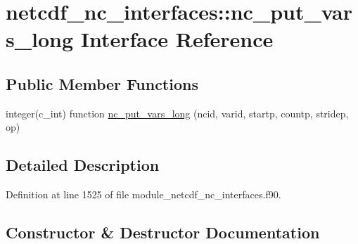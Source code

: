 \hypertarget{interfacenetcdf__nc__interfaces_1_1nc__put__vars__long}{}\section{netcdf\+\_\+nc\+\_\+interfaces\+:\+:nc\+\_\+put\+\_\+vars\+\_\+long Interface Reference}
\label{interfacenetcdf__nc__interfaces_1_1nc__put__vars__long}
\subsection*{Public Member Functions}
\begin{DoxyCompactItemize}
\item 
integer(c\+\_\+int) function \hyperlink{interfacenetcdf__nc__interfaces_1_1nc__put__vars__long_a24894e9bed55345b88fc8c1535c86c10}{nc\+\_\+put\+\_\+vars\+\_\+long} (ncid, varid, startp, countp, stridep, op)
\end{DoxyCompactItemize}


\subsection{Detailed Description}


Definition at line 1525 of file module\+\_\+netcdf\+\_\+nc\+\_\+interfaces.\+f90.



\subsection{Constructor \& Destructor Documentation}
\mbox{\label{interfacenetcdf__nc__interfaces_1_1nc__put__vars__long_a24894e9bed55345b88fc8c1535c86c10}} 
